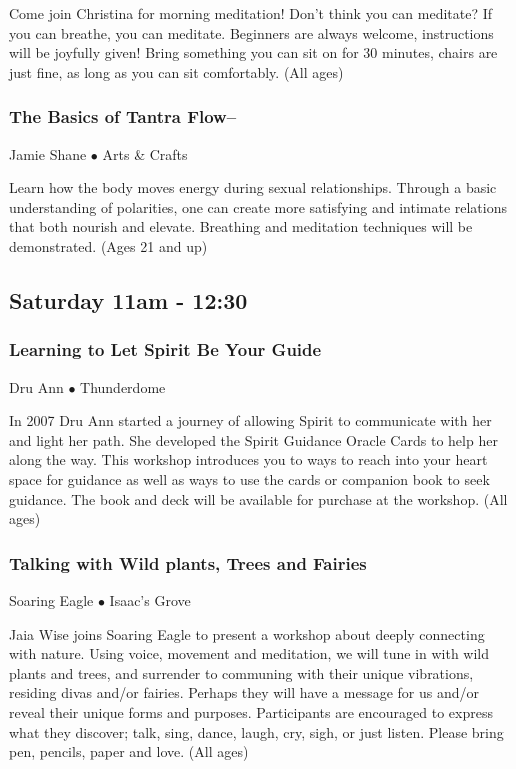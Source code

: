  Come join Christina for morning meditation! Don't think you can meditate? If you can breathe, you can meditate. Beginners are always welcome, instructions will be joyfully given! Bring something you can sit on for 30 minutes, chairs are just fine, as long as you can sit comfortably. {\small (All ages)}

\subsubsection{The Basics of Tantra Flow--}
\label{Sat-Shane2}
{\small Jamie Shane $\bullet$  Arts \& Crafts}

 Learn how the body moves energy during sexual relationships. Through a basic understanding of polarities, one can create more satisfying and intimate relations that both nourish and elevate. Breathing and meditation techniques will be demonstrated.  {\small (Ages 21 and up)}

\subsection{Saturday 11am - 12:30}

\subsubsection{Learning to Let Spirit Be Your Guide}
\label{Sat-DruAnn3}
{\small Dru Ann $\bullet$  Thunderdome}

 In 2007 Dru Ann started a journey of allowing Spirit to communicate with her and light her path. She developed the Spirit Guidance Oracle Cards to help her along the way. This workshop introduces you to ways to reach into your heart space for guidance as well as ways to use the cards or companion book to seek guidance.  The book and deck will be available for purchase at the workshop. {\small (All ages)}

\subsubsection{Talking with Wild plants, Trees and Fairies}
\label{Sat-Eagle1}
{\small Soaring Eagle $\bullet$  Isaac's Grove}

 Jaia Wise joins Soaring Eagle to present a workshop about deeply connecting with nature. Using voice, movement and meditation, we will tune in with wild plants and trees, and surrender to communing with their unique vibrations, residing divas and/or fairies. Perhaps they will have a message for us and/or reveal their unique forms and purposes. Participants are encouraged to express what they discover; talk, sing, dance, laugh, cry, sigh, or just listen. Please bring pen, pencils, paper and love. {\small (All ages)}

